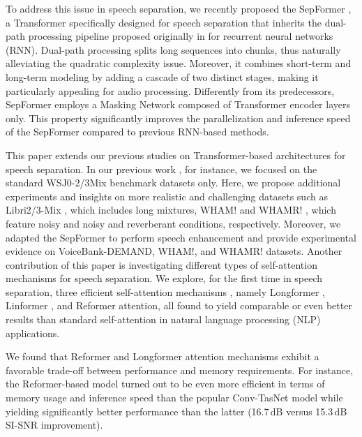 \documentclass[lettersize,journal]{IEEEtran}
\begin{document}
To address this issue in speech separation, we recently proposed the SepFormer \cite{subakan2020attention}, a Transformer specifically designed for speech separation that inherits the dual-path processing pipeline proposed originally in \cite{luo2020dualpath} for recurrent neural networks (RNN).
Dual-path processing splits long sequences into chunks, thus naturally alleviating the quadratic complexity issue. Moreover, it combines short-term and long-term modeling by adding a cascade of two distinct stages, making it particularly appealing for audio processing. Differently from its predecessors, SepFormer employs a Masking Network composed of Transformer encoder layers only. This property significantly improves the parallelization and inference speed of the SepFormer compared to previous RNN-based methods.


This paper extends our previous studies on Transformer-based architectures for speech separation. In our previous work \cite{subakan2020attention}, for instance, we focused on the standard WSJ0-2/3Mix benchmark datasets only.
Here, we propose additional experiments and insights on more realistic and challenging datasets such as  Libri2/3-Mix \cite{cosentino2020librimix}, which includes long mixtures, WHAM! \cite{wichern2019wham} and WHAMR! \cite{maciejewski2020whamr}, which feature noisy and noisy and reverberant conditions, respectively. 
Moreover,  we adapted the SepFormer to perform speech enhancement and provide experimental evidence on VoiceBank-DEMAND, WHAM!, and WHAMR! datasets.
Another contribution of this paper is investigating different types of self-attention mechanisms for speech separation.
We explore, for the first time in speech separation, three efficient self-attention mechanisms \cite{luo2020dualpath}, namely Longformer \cite{beltagy2020longformer}, Linformer \cite{wang2020linformer}, and Reformer \cite{kitaev2020reformer} attention, all found to yield comparable or even better results than standard self-attention in natural language processing (NLP) applications.


We found that Reformer and Longformer attention mechanisms exhibit a favorable trade-off between performance and memory requirements. For instance, the Reformer-based model turned out to be even more efficient in terms of memory usage and inference speed than the popular Conv-TasNet model while yielding significantly better performance than the latter (16.7\,dB versus 15.3\,dB SI-SNR improvement). 
\end{document}
